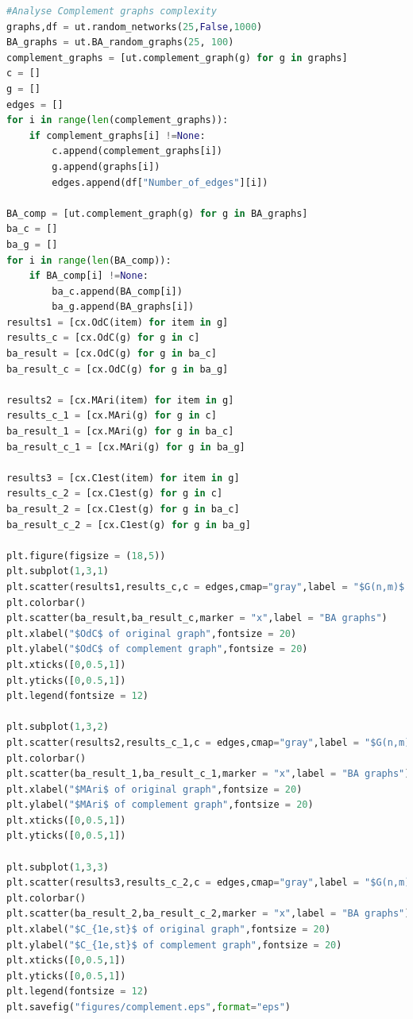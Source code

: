 \documentclass[12pt]{article}
\begin{document}
\begin{lstlisting}[breaklines=true,language=Python]
#Analyse Complement graphs complexity
graphs,df = ut.random_networks(25,False,1000)
BA_graphs = ut.BA_random_graphs(25, 100)
complement_graphs = [ut.complement_graph(g) for g in graphs]
c = []
g = []
edges = []
for i in range(len(complement_graphs)):
    if complement_graphs[i] !=None:
        c.append(complement_graphs[i])
        g.append(graphs[i])
        edges.append(df["Number_of_edges"][i])
    
BA_comp = [ut.complement_graph(g) for g in BA_graphs]
ba_c = []
ba_g = []
for i in range(len(BA_comp)):
    if BA_comp[i] !=None:
        ba_c.append(BA_comp[i])
        ba_g.append(BA_graphs[i])
results1 = [cx.OdC(item) for item in g]
results_c = [cx.OdC(g) for g in c]
ba_result = [cx.OdC(g) for g in ba_c]
ba_result_c = [cx.OdC(g) for g in ba_g]

results2 = [cx.MAri(item) for item in g]
results_c_1 = [cx.MAri(g) for g in c]
ba_result_1 = [cx.MAri(g) for g in ba_c]
ba_result_c_1 = [cx.MAri(g) for g in ba_g]

results3 = [cx.C1est(item) for item in g]
results_c_2 = [cx.C1est(g) for g in c]
ba_result_2 = [cx.C1est(g) for g in ba_c]
ba_result_c_2 = [cx.C1est(g) for g in ba_g]

plt.figure(figsize = (18,5))
plt.subplot(1,3,1)
plt.scatter(results1,results_c,c = edges,cmap="gray",label = "$G(n,m)$ random graphs")
plt.colorbar()
plt.scatter(ba_result,ba_result_c,marker = "x",label = "BA graphs")
plt.xlabel("$OdC$ of original graph",fontsize = 20)
plt.ylabel("$OdC$ of complement graph",fontsize = 20)
plt.xticks([0,0.5,1])
plt.yticks([0,0.5,1])
plt.legend(fontsize = 12)

plt.subplot(1,3,2)
plt.scatter(results2,results_c_1,c = edges,cmap="gray",label = "$G(n,m)$ random graphs")
plt.colorbar()
plt.scatter(ba_result_1,ba_result_c_1,marker = "x",label = "BA graphs")
plt.xlabel("$MAri$ of original graph",fontsize = 20)
plt.ylabel("$MAri$ of complement graph",fontsize = 20)
plt.xticks([0,0.5,1])
plt.yticks([0,0.5,1])

plt.subplot(1,3,3)
plt.scatter(results3,results_c_2,c = edges,cmap="gray",label = "$G(n,m)$ random graphs")
plt.colorbar()
plt.scatter(ba_result_2,ba_result_c_2,marker = "x",label = "BA graphs")
plt.xlabel("$C_{1e,st}$ of original graph",fontsize = 20)
plt.ylabel("$C_{1e,st}$ of complement graph",fontsize = 20)
plt.xticks([0,0.5,1])
plt.yticks([0,0.5,1])
plt.legend(fontsize = 12)
plt.savefig("figures/complement.eps",format="eps")
\end{lstlisting}
\end{document}
